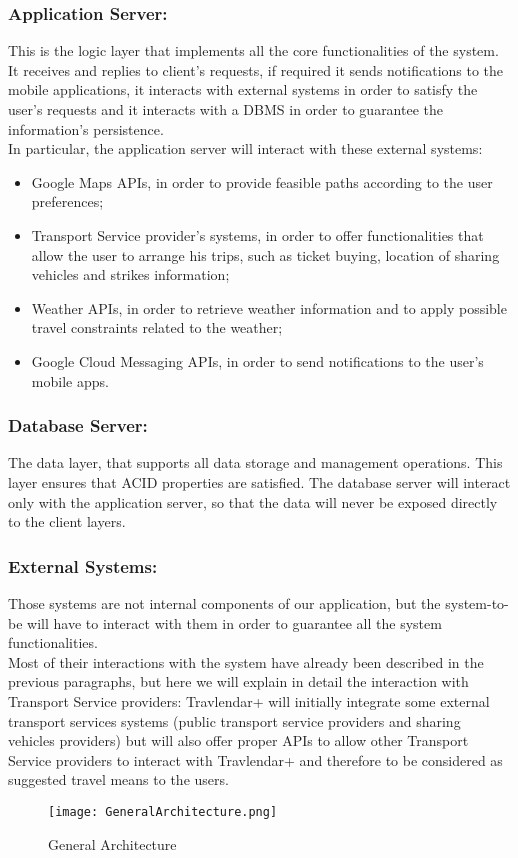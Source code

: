 \subsubsection{Application Server:}
\label{subsubsect:Application Server}
This is the logic layer that implements all the core functionalities of the system. It receives and replies to client's requests, if required it sends notifications to the mobile applications, it interacts with external systems in order to satisfy the user's requests and it interacts with a DBMS in order to guarantee the information's persistence.\\
In particular, the application server will interact with these external systems:
\begin{itemize}
\item Google Maps APIs, in order to provide feasible paths according to the user preferences;
\item Transport Service provider's systems, in order to offer functionalities that allow the user to arrange his trips, such as ticket buying, location of sharing vehicles and strikes information;
\item Weather APIs, in order to retrieve weather information and to apply possible travel constraints related to the weather;
\item Google Cloud Messaging APIs, in order to send notifications to the user's mobile apps.
\end{itemize} 

\subsubsection{Database Server:}
\label{subsubsect:Database Server}
The data layer, that supports all data storage and management operations. This layer ensures that ACID properties are satisfied. The database server will interact only with the application server, so that the data will never be exposed directly to the client layers.

\subsubsection{External Systems:}
\label{subsubsect:External Systems}
Those systems are not internal components of our application, but the system-to-be will have to interact with them in order to guarantee all the system functionalities. \\
Most of their interactions with the system have already been described in the previous paragraphs, but here we will explain in detail the interaction with Transport Service providers: Travlendar+ will initially integrate some external transport services systems (public transport service providers and sharing vehicles providers) but will also offer proper APIs to allow other Transport Service providers to interact with Travlendar+ and therefore to be considered as suggested travel means to the users.

\begin{figure}[H]
\begin{center}
		\hspace*{-50pt}
		\texttt{[image: GeneralArchitecture.png]}
\end{center}
\caption{General Architecture}
\end{figure}
